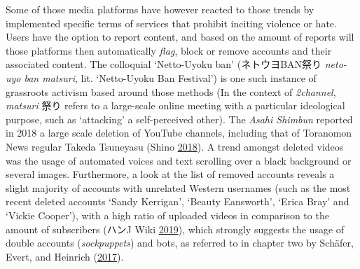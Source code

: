 \documentclass[10pt,british,A4paper,,openany]{memoir}
\begin{document}
Some of those media platforms have however reacted to those trends by
implemented specific terms of services that prohibit inciting violence
or hate. Users have the option to report content, and based on the
amount of reports will those platforms then automatically \emph{flag},
block or remove accounts and their associated content. The colloquial
`Netto-Uyoku ban' (ネトウヨBAN祭り \emph{neto-uyo ban matsuri}, lit.
`Netto-Uyoku Ban Festival') is one such instance of grassroots activism
based around those methods (In the context of \emph{2channel},
\emph{matsuri} 祭り refers to a large-scale online meeting with a
particular ideological purpose, such as `attacking' a self-perceived
other). The \emph{Asahi Shimbun} reported in 2018 a large scale deletion
of YouTube channels, including that of Toranomon News regular Takeda
Tsuneyasu (Shino \protect\hyperlink{ref-shino_eng:_2018}{2018}). A trend
amongst deleted videos was the usage of automated voices and text
scrolling over a black background or several images. Furthermore, a look
at the list of removed accounts reveals a slight majority of accounts
with unrelated Western usernames (such as the most recent deleted
accounts `Sandy Kerrigan', `Beauty Eansworth', `Erica Bray' and `Vickie
Cooper'), with a high ratio of uploaded videos in comparison to the
amount of subscribers (ハンJ Wiki
\protect\hyperlink{ref-j_wiki_completed_2019}{2019}), which strongly
suggests the usage of double accounts (\emph{sockpuppets}) and bots, as
referred to in chapter two by Schäfer, Evert, and Heinrich
(\protect\hyperlink{ref-schafer_japans_2017}{2017}).
\end{document}
